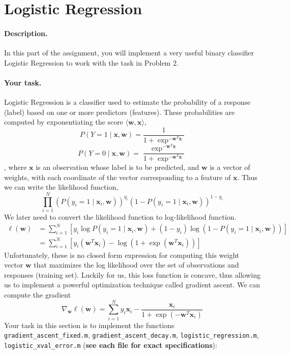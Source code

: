 \section{Logistic Regression }

\paragraph{Description.} In this part of the assignment, you will implement a very useful binary classifier Logistic Regression to work with the task in Problem 2. 

\paragraph{Your task.} Logistic Regression is a classifier used to estimate the probability of a response (label) based on one or more predictors (features). These probabilities are computed by exponentiating the score $\langle \textbf{w},\textbf{x}\rangle$, 
\[P(Y=1 \mid \textbf{x},\textbf{w}) = \frac{1}{1 + \exp^{-\textbf{w}^T\textbf{x}}}\]
\[P(Y=0 \mid \textbf{x},\textbf{w}) = \frac{\exp^{-\textbf{w}^T\textbf{x}}}{1 + \exp^{-\textbf{w}^T\textbf{x}}}\]
, where $\textbf{x}$ is an observation whose label is to be predicted, and $\textbf{w}$ is a vector of weights, with each coordinate of the vector corresponding to a feature of $\textbf{x}$.  Thus we can write the likelihood function,
\[\prod_{i=1}^N(P(y_i=1 \mid \textbf{x}_i, \textbf{w}))^{y_i}(1-P(y_i=1 \mid \textbf{x}_i, \textbf{w}))^{1-y_i}\]
We later need to convert the likelihood function to log-likelihood function.
\begin{align}
    \ell(\textbf{w}) &= \sum\limits_{i=1}^{N} [ y_i \log P(y_i=1 \mid \textbf{x}_i, \textbf{w}) + (1-y_i)\log(1-P(y_i=1 \mid \textbf{x}_i, \textbf{w}))] \\
    &= \sum\limits_{i=1}^N [ y_i(\textbf{w}^T\textbf{x}_i) - \log (1 + \exp(\textbf{w}^T\textbf{x}_i))]
\end{align}
Unfortunately, these is no closed form expression for computing this weight vector $\textbf{w}$ that maximizes the log likelihood over the set of observations and responses (training set). Luckily for us, this loss function is concave, thus allowing us to implement a powerful optimization technique called gradient ascent. We can compute the gradient 
\[\nabla_\textbf{w}\ell(\textbf{w}) = \sum\limits_{i=1}^Ny_i\textbf{x}_i-\frac{\textbf{x}_i}{1+\exp(-\textbf{w}^T\textbf{x}_i)}\]
Your task in this section is to implement the functions {\tt gradient\_ascent\_fixed.m}, {\tt gradient\_ascent\_decay.m}, {\tt logistic\_regression.m}, {\tt logistic\_xval\_error.m}
({\bf see each file for exact specifications}):


